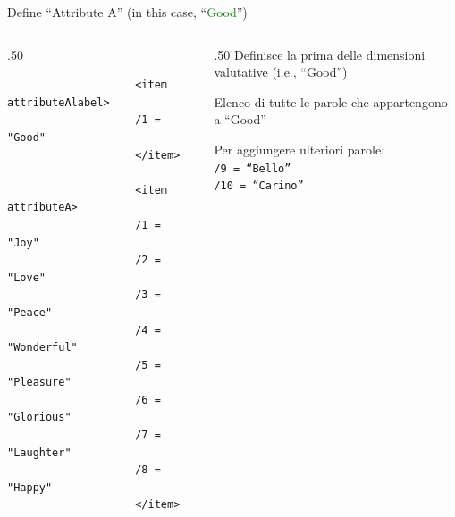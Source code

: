 \documentclass{beamer}
\begin{document}
\begin{frame}[fragile]
	Define ``Attribute A'' (in this case, ``\textcolor{green}{Good}'')
	
	\begin{columns}
		\begin{column}[T]{.50\linewidth}
			\begin{small}
					\begin{verbatim}
					<item attributeAlabel>
					/1 = "Good"
					</item>
					
					<item attributeA>
					/1 = "Joy"
					/2 = "Love"
					/3 = "Peace"
					/4 = "Wonderful"
					/5 = "Pleasure"
					/6 = "Glorious"
					/7 = "Laughter"
					/8 = "Happy"
					</item>
				\end{verbatim}
			\end{small}
		\end{column}
	
		\begin{column}[T]{.50\linewidth}
			\vspace{5mm}
		Definisce la prima delle dimensioni valutative (i.e., ``Good'')
		
		\vspace{10mm}
		
		Elenco di tutte le parole che appartengono a ``Good''
		
		Per aggiungere ulteriori parole: \\ \texttt{/9 = ``Bello''  \\  /10 = ``Carino''}
	\end{column}
	\end{columns}



\end{frame}
\end{document}
